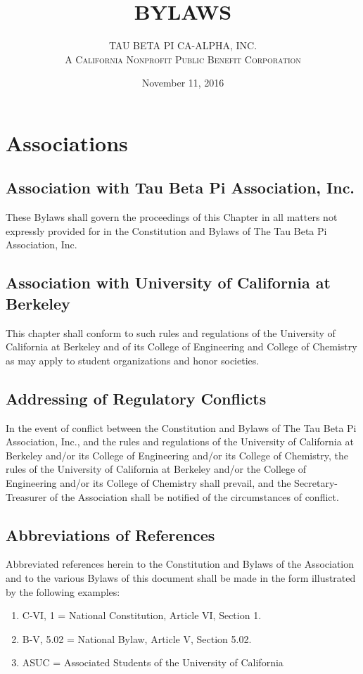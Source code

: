 \documentclass{article}
\begin{document}
	\title{\textbf {\uppercase{Bylaws}}}
	\author{\uppercase{Tau Beta Pi CA-Alpha, Inc.} \\ \textsc{A California Nonprofit Public Benefit Corporation}}
	\date{November 11, 2016}
	\maketitle
	\clearpage


	\section{Associations}
	\subsection{Association with Tau Beta Pi Association, Inc.}
	These Bylaws shall govern the proceedings of this Chapter in all matters not expressly provided for in the Constitution and Bylaws of The Tau Beta Pi Association, Inc.
	\subsection{Association with University of California at Berkeley}
	This chapter shall conform to such rules and regulations of the University of California at Berkeley and of its College of Engineering and College of Chemistry as may apply to student organizations and honor societies.
	\subsection{Addressing of Regulatory Conflicts}
	In the event of conflict between the Constitution and Bylaws of The Tau Beta Pi Association, Inc., and the rules and regulations of the University of California at Berkeley and/or its College of Engineering and/or its College of Chemistry, the rules of the University of California at Berkeley and/or the College of Engineering and/or its College of Chemistry shall prevail, and the Secretary- Treasurer of the Association shall be notified of the circumstances of conflict.
	\subsection{Abbreviations of References}
	Abbreviated references herein to the Constitution and Bylaws of the Association and to the various Bylaws of this document shall be made in the form illustrated by the following examples:
	\begin{enumerate}[\indent a)]
	\item C-VI, 1 = National Constitution, Article VI, Section 1. 
	\item B-V, 5.02 = National Bylaw, Article V, Section 5.02.
	\item ASUC = Associated Students of the University of California 
	\end{enumerate}
	
\end{document}

